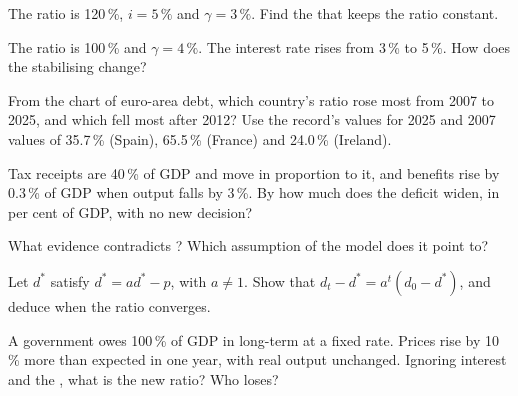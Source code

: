 \begin{exercise}[$\star\star$]\label{exo:g12:fiscal-policy-and-debt:8}
The ratio is 120\,\%, $i = 5\,\%$ and $\gamma = 3\,\%$. Find the  that keeps the ratio constant.
\end{exercise}

\begin{exercise}[$\star\star$]\label{exo:g12:fiscal-policy-and-debt:9}
The ratio is 100\,\% and $\gamma = 4\,\%$. The interest rate rises from 3\,\% to 5\,\%. How does the stabilising  change?
\end{exercise}

\begin{exercise}[$\star\star$]\label{exo:g12:fiscal-policy-and-debt:10}
From the chart of euro-area debt, which country's ratio rose most from 2007 to 2025, and which fell most after 2012? Use the record's values for 2025 and 2007 values of
35.7\,\% (Spain), 65.5\,\% (France) and 24.0\,\% (Ireland).
\end{exercise}

\begin{exercise}[$\star\star$]\label{exo:g12:fiscal-policy-and-debt:11}
Tax receipts are 40\,\% of GDP and move in proportion to it, and benefits rise by 0.3\,\% of GDP when output falls by 3\,\%. By how much does the deficit widen, in per cent
of GDP, with no new decision?
\end{exercise}

\begin{exercise}[$\star\star\star$]\label{exo:g12:fiscal-policy-and-debt:12}
What evidence contradicts ? Which assumption of the model does it point to?
\end{exercise}

\begin{exercise}[$\star\star\star$]\label{exo:g12:fiscal-policy-and-debt:13}
Let $d^*$ satisfy $d^* = a d^* - p$, with $a \neq 1$. Show that $d_t - d^* = a^t (d_0 - d^*)$, and deduce when the ratio converges.
\end{exercise}

\begin{exercise}[$\star\star\star$]\label{exo:g12:fiscal-policy-and-debt:14}
A government owes 100\,\% of GDP in long-term  at a fixed rate. Prices rise by 10\,\% more than expected in one year, with real output unchanged. Ignoring interest and
the , what is the new ratio? Who loses?
\end{exercise}

